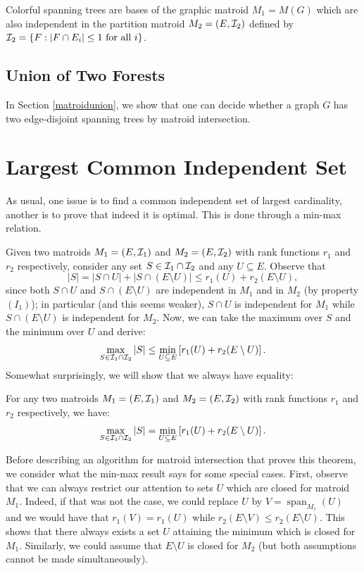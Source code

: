 \documentclass[12pt]{article}
\begin{document}
Colorful spanning trees are bases of the graphic matroid $M_1=M(G)$ which
are also independent in the partition matroid $M_2=(E,{\cal I}_2)$
defined by ${\cal I}_2=\{F: |F\cap E_i|\leq 1 \mbox{ for all } i\}$. 

\subsection{Union of Two Forests}
In Section \ref{matroidunion}, we show that one can decide whether a graph
$G$ has two edge-disjoint spanning trees by matroid intersection. 


\section{Largest Common Independent Set}
As usual, one issue is to find a common independent set of largest
cardinality, another is to prove that indeed it is optimal. This is
done through a min-max relation. 

Given two matroids $M_1=(E, {\cal I}_1)$ and $M_2=(E, {\cal I}_2)$
with rank functions $r_1$ and $r_2$ respectively, consider any set
$S\in {\cal I}_1\cap {\cal I}_2$ and any $U\subseteq E$. Observe that
$$|S|=|S\cap U|+ |S\cap (E\setminus U)| \leq r_1(U) + r_2(E\setminus
U),$$ since both $S\cap U$ and $S\cap (E\setminus U)$ are independent
in $M_1$ and in $M_2$ (by property $(I_1)$); in particular (and this
seems weaker), $S\cap U$ is independent for $M_1$ while $S\cap
(E\setminus U)$ is independent for $M_2$. Now, we can take the maximum
over $S$ and the minimum over $U$ and derive:
$$\max_{S\in {\cal I}_1 \cap {\cal I}_2} |S| \leq \min_{U\subseteq E}
\left[ r_1(U) + r_2(E\setminus U)\right].$$
Somewhat surprisingly, we will show that we always have equality:
\begin{theorem} \label{thm:matint}
For any two matroids  $M_1=(E, {\cal I}_1)$ and $M_2=(E, {\cal I}_2)$
with rank functions $r_1$ and $r_2$ respectively, we have:
\begin{equation} \label{eqminmax}
\max_{S\in {\cal I}_1 \cap {\cal I}_2} |S| =\min_{U\subseteq E}
\left[ r_1(U) + r_2(E\setminus U)\right].
\end{equation}
\end{theorem}

Before describing an algorithm for matroid intersection that proves
this theorem, we consider what the min-max result says for some special
cases. First, observe that we can always restrict our attention to
sets $U$ which are closed for matroid $M_1$. Indeed, if that was not
the case, we could replace $U$ by $V=\operatorname{span}_{M_1}(U)$ and we would have
that $r_1(V)=r_1(U)$ while $r_2(E\setminus V)\leq r_2(E\setminus
U)$. This shows that there always exists a set $U$ attaining the
minimum which is closed for $M_1$. Similarly, we could assume that
$E\setminus U$ is closed for $M_2$ (but both assumptions cannot be
made simultaneously).  
\end{document}
